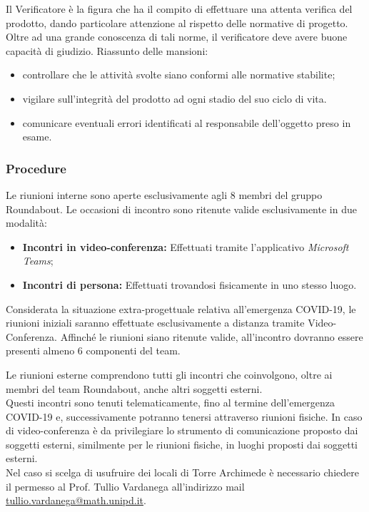 			Il Verificatore è la figura che ha il compito di effettuare una attenta verifica del prodotto, dando particolare attenzione al rispetto delle normative di progetto. Oltre ad una grande conoscenza di tali norme, il verificatore deve avere buone capacità di giudizio.
			Riassunto delle mansioni:
			\begin{itemize}
				\item controllare che le attività svolte siano conformi alle normative stabilite;
				\item vigilare sull'integrità del prodotto ad ogni stadio del suo ciclo di vita.
				\item comunicare eventuali errori identificati al responsabile dell'oggetto preso in esame.
			\end{itemize}
		
		
		\subsubsection{Procedure}
				Le riunioni interne sono aperte esclusivamente agli 8 membri del gruppo Roundabout. Le occasioni di incontro sono ritenute valide esclusivamente in due modalità:
				\begin{itemize}
					\item \textbf{Incontri in video-conferenza:} Effettuati tramite l'applicativo \textit{Microsoft Teams};
					\item \textbf{Incontri di persona:} Effettuati trovandosi fisicamente in uno stesso luogo.
				\end{itemize}
				Considerata la situazione extra-progettuale relativa all'emergenza COVID-19, le riunioni iniziali saranno effettuate esclusivamente a distanza tramite Video-Conferenza.
				Affinché le riunioni siano ritenute valide, all'incontro dovranno essere presenti almeno 6 componenti del team.
			
				Le riunioni esterne comprendono tutti gli incontri che coinvolgono, oltre ai membri del team Roundabout, anche altri soggetti esterni.\\
				Questi incontri sono tenuti telematicamente, fino al termine dell'emergenza COVID-19 e, successivamente potranno tenersi attraverso riunioni fisiche. In caso di video-conferenza è da privilegiare lo strumento di comunicazione proposto dai soggetti esterni, similmente per le riunioni fisiche, in luoghi proposti dai soggetti esterni.\\
				Nel caso si scelga di usufruire dei locali di Torre Archimede è necessario chiedere il permesso al Prof. Tullio Vardanega all'indirizzo mail \href{mailto:tullio.vardanega@math.unipd.it}{tullio.vardanega@math.unipd.it}.
			
